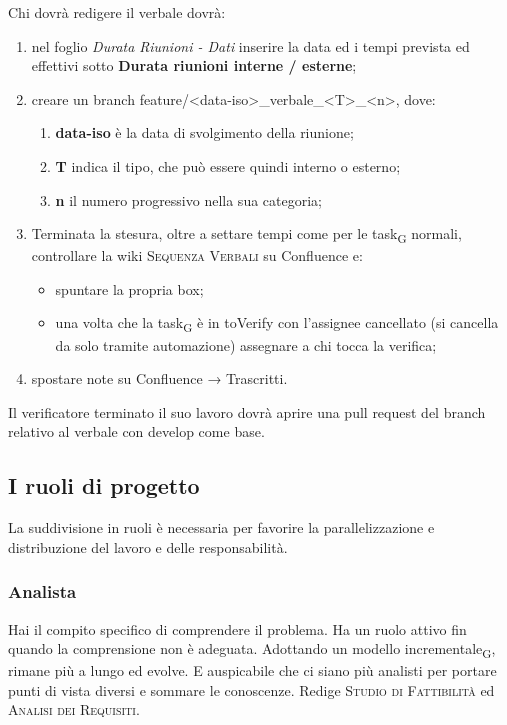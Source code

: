     	Chi dovrà redigere il verbale dovrà:
    	\begin{enumerate}
    		\item nel foglio \textit{Durata Riunioni - Dati} inserire la data ed i tempi prevista ed effettivi  sotto \textbf{Durata riunioni interne / esterne};
    		\item creare un branch feature/<data-iso>\_verbale\_<T>\_<n>, dove:
            \begin{enumerate}
                \item \textbf{data-iso} è la data di svolgimento della riunione;
                \item \textbf{T} indica il tipo, che può essere quindi interno o esterno;
                \item \textbf{n} il numero progressivo nella sua categoria;
            \end{enumerate}
    		\item Terminata la stesura, oltre a settare tempi come per le task\textsubscript{G} normali, controllare la wiki \textsc{Sequenza Verbali} su Confluence e:
    		\begin{itemize}
    			\item spuntare la propria box;
    			\item una volta che la task\textsubscript{G} è in toVerify con l’assignee cancellato (si cancella da solo tramite automazione) assegnare a chi tocca la verifica;
    		\end{itemize}
    		\item spostare note su Confluence → Trascritti.
    	\end{enumerate}
        Il verificatore terminato il suo lavoro dovrà aprire una pull request del branch relativo al verbale con develop come base.

\subsection{I ruoli di progetto}
    La suddivisione in ruoli è necessaria per favorire la parallelizzazione e distribuzione del lavoro e delle responsabilità.
    \subsubsection{Analista}
    Hai il compito specifico di comprendere il problema. Ha un ruolo attivo fin quando la comprensione non è adeguata. Adottando un modello incrementale\textsubscript{G}, rimane più a lungo ed evolve. E auspicabile che ci siano più analisti per portare punti di vista diversi e sommare le conoscenze. Redige \textsc{Studio di Fattibilità} ed \textsc{Analisi dei Requisiti}.
